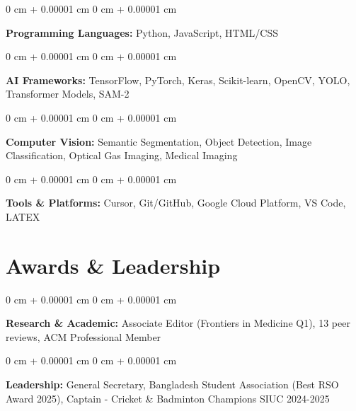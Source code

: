 \documentclass[10pt, letterpaper]{article}
\newenvironment{onecolentry}{
    \begin{adjustwidth}{
        0 cm + 0.00001 cm
    }{
        0 cm + 0.00001 cm
    }
}{
    \end{adjustwidth}
} %
\begin{document}
        \begin{onecolentry}
            \textbf{Programming Languages:} Python, JavaScript, HTML/CSS
        \end{onecolentry}

        \vspace{0.1 cm}

        \begin{onecolentry}
            \textbf{AI Frameworks:} TensorFlow, PyTorch, Keras, Scikit-learn, OpenCV, YOLO, Transformer Models, SAM-2
        \end{onecolentry}

        \vspace{0.1 cm}

        \begin{onecolentry}
            \textbf{Computer Vision:} Semantic Segmentation, Object Detection, Image Classification, Optical Gas Imaging, Medical Imaging
        \end{onecolentry}

        \vspace{0.1 cm}

        \begin{onecolentry}
            \textbf{Tools \& Platforms:} Cursor, Git/GitHub, Google Cloud Platform, VS Code, LATEX
        \end{onecolentry}

    \section{Awards \& Leadership}

        \begin{onecolentry}
            \textbf{Research \& Academic:} Associate Editor (Frontiers in Medicine Q1), 13 peer reviews, ACM Professional Member
        \end{onecolentry}

        \vspace{0.1 cm}

        \begin{onecolentry}
            \textbf{Leadership:} General Secretary,  Bangladesh Student Association (Best RSO Award 2025), Captain - Cricket \& Badminton Champions SIUC 2024-2025
        \end{onecolentry}
\end{document}
